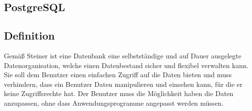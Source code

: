 \subsection{Postgre\acs{SQL}}

\subsection*{Definition}
\label{ssec:Datenbanken_Definition}
Gemäß Steiner ist eine Datenbank eine selbstständige und auf Dauer ausgelegte Datenorganisation, welche einen Datenbestand sicher und flexibel verwalten kann.
Sie soll dem Benutzer einen einfachen Zugriff auf die Daten bieten und muss verhindern, dass ein Benutzer Daten manipulieren und einsehen kann, für die er keine Zugriffsrechte hat.
Der Benutzer muss die Möglichkeit haben die Daten anzupassen, ohne dass Anwendungsprogramme angepasst werden müssen.\autocite[Vgl.][S.5 f.]{Book_DB_2} 

